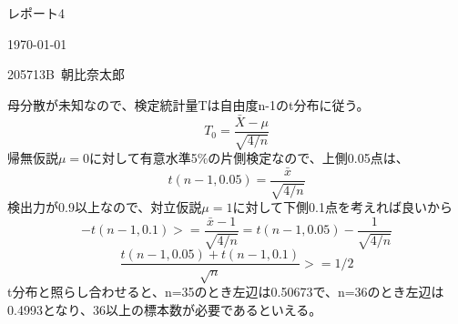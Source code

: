 \documentclass[11pt]{jsarticle}
\begin{document}
レポート4
\begin{flushright}
\today
\end{flushright}
\begin{flushright}
  205713B\ 朝比奈太郎
\end{flushright}
母分散が未知なので、検定統計量Tは自由度n-1のt分布に従う。
\[
T_0 = \frac{\bar X - \mu}{\sqrt{4/n}}
\]
帰無仮説$\mu=0$に対して有意水準5\%の片側検定なので、上側0.05点は、
\[
t(n-1, 0.05) = \frac{\bar x}{\sqrt{4/n}}
\]
検出力が0.9以上なので、対立仮説$\mu=1$に対して下側0.1点を考えれば良いから
\[
-t(n-1, 0.1)>= \frac{\bar x-1}{\sqrt{4/n}} = t(n-1, 0.05) - \frac{1}{\sqrt{4/n}}
\]
\[
\frac{t(n-1,0.05)+t(n-1,0.1)}{\sqrt{n}}>=1/2
\]
t分布と照らし合わせると、n=35のとき左辺は0.50673で、n=36のとき左辺は0.4993となり、36以上の標本数が必要であるといえる。
\end{document}
